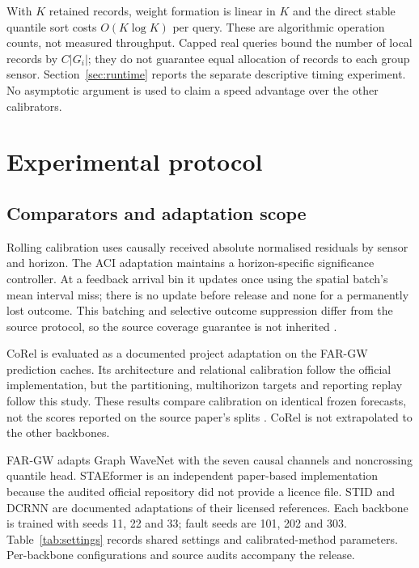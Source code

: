 \documentclass[pdflatex,sn-mathphys-num]{sn-jnl}
\newcounter{algorithm}
\begin{document}
With $K$ retained records, weight formation is linear in $K$ and the direct stable quantile sort costs $O(K\log K)$ per query. These are algorithmic operation counts, not measured throughput. Capped real queries bound the number of local records by $C|G_i|$; they do not guarantee equal allocation of records to each group sensor. Section~\ref{sec:runtime} reports the separate descriptive timing experiment. No asymptotic argument is used to claim a speed advantage over the other calibrators.

\section{Experimental protocol}\label{sec:protocol}
\subsection{Comparators and adaptation scope}
Rolling calibration uses causally received absolute normalised residuals by sensor and horizon. The ACI adaptation maintains a horizon-specific significance controller. At a feedback arrival bin it updates once using the spatial batch's mean interval miss; there is no update before release and none for a permanently lost outcome. This batching and selective outcome suppression differ from the source protocol, so the source coverage guarantee is not inherited \citep{hallberg2024}.

CoRel is evaluated as a documented project adaptation on the FAR-GW prediction caches. Its architecture and relational calibration follow the official implementation, but the partitioning, multihorizon targets and reporting replay follow this study. These results compare calibration on identical frozen forecasts, not the scores reported on the source paper's splits \citep{cini2025}. CoRel is not extrapolated to the other backbones.

FAR-GW adapts Graph WaveNet with the seven causal channels and noncrossing quantile head. STAEformer is an independent paper-based implementation because the audited official repository did not provide a licence file. STID and DCRNN are documented adaptations of their licensed references. Each backbone is trained with seeds 11, 22 and 33; fault seeds are 101, 202 and 303. Table~\ref{tab:settings} records shared settings and calibrated-method parameters. Per-backbone configurations and source audits accompany the release.
\end{document}

